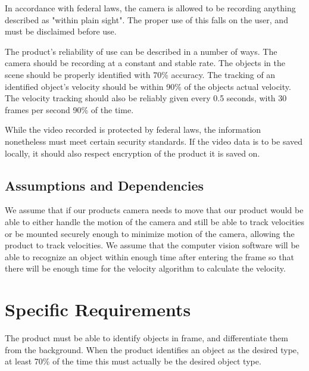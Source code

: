 \documentclass[letterpaper,10pt,onecolumn,draftclsnofoot]{IEEEtran}
\begin{document}
In accordance with federal laws, the camera is allowed to be recording anything described as "within plain sight".
The proper use of this falls on the user, and must be disclaimed before use.

The product's reliability of use can be described in a number of ways.
The camera should be recording at a constant and stable rate.
The objects in the scene should be properly identified with 70\% accuracy.
The tracking of an identified object's velocity should be within 90\% of the objects actual velocity.
The velocity tracking should also be reliably given every 0.5 seconds, with 30 frames per second 90\% of the time.

While the video recorded is protected by federal laws, the information nonetheless must meet certain security standards.
If the video data is to be saved locally, it should also respect encryption of the product it is saved on.

\subsection{Assumptions and Dependencies}
We assume that if our products camera needs to move that our product would be able to either handle the motion of the camera and still be able to track velocities or be mounted securely enough to minimize motion of the camera, allowing the product to track velocities.
We assume that the computer vision software will be able to recognize an object within enough time after entering the frame so that there will be enough time for the velocity algorithm to calculate the velocity.

\section{Specific Requirements}
The product must be able to identify objects in frame, and differentiate them from the background.
When the product identifies an object as the desired type, at least 70\% of the time this must actually be the desired object type.
\end{document}
